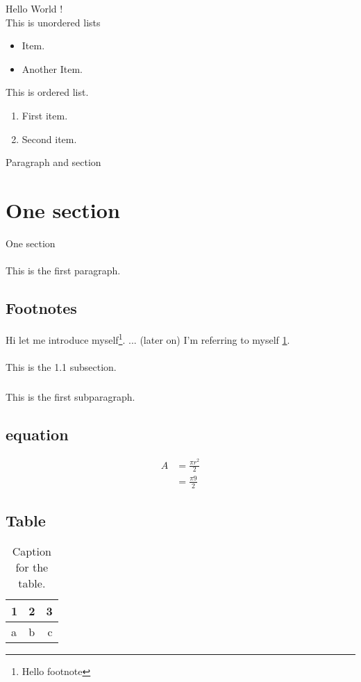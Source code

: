 \documentclass[a4paper]{article}%
\begin{document}
 
\tableofcontents
\newpage

Hello World ! \\ %

This is unordered lists
\begin{itemize}
\item Item.
\item Another Item.
\end{itemize}

This is ordered list.

\begin{enumerate}
\item First item.
\item Second item.\\
\end{enumerate}

Paragraph and section
\section{One section}
One section

\paragraph{}
  This is the first paragraph.

\subsection{Footnotes}
Hi let me introduce myself\footnote{\label{myfootnote}Hello footnote}.
... (later on)\newline
I'm referring to myself \ref{myfootnote}.

\paragraph{}
  This is the 1.1 subsection.

\subparagraph{}
  This is the first subparagraph.
  
\subsection{equation}
\begin{equation}
\begin{split}
A & = \frac{\pi r^2}{2} \\
  & = \frac{\pi 9}{2}
\end{split}
\end{equation}

\subsection{Table}
\begin{table}[h!]
\centering
\caption{Caption for the table.}
\label{tab:table1}
\begin{tabular}{l||c||r}
	1 & 2 & 3\\
	\hline
	a & b & c\\
\end{tabular}

\end{table}
  
\end{document}
